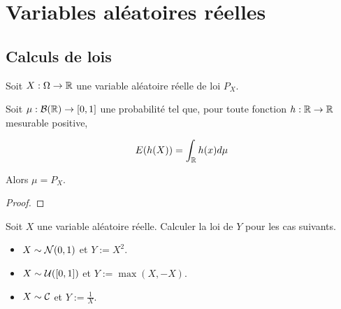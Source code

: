 \chapter{Variables aléatoires réelles}

\label{chapter:variables_aleatoires_reelles}

\section{Calculs de lois}

\begin{proposition}
	Soit $X : \Omega \rightarrow \mathbb{R}$ une variable aléatoire réelle de loi
	$P_{X}$.

	Soit $\mu : \mathcal{B}(\mathbb{R}) \rightarrow [0, 1]$ une probabilité
	tel que, pour toute fonction $h : \mathbb{R} \rightarrow \mathbb{R}$ mesurable
	positive,

	\begin{equation}
		E(h(X)) = \int_{\mathbb{R}} h(x) d\mu
	\end{equation}

	Alors $\mu = P_{X}$.
\end{proposition}

\ifdefined\outputproof
\begin{proof}

\end{proof}

\begin{exercice}
	Soit $X$ une variable aléatoire réelle. Calculer la loi de $Y$ pour les cas
	suivants.
	\begin{itemize}
		\item $X \sim \mathcal{N}(0, 1)$ et $Y := X^{2}$.
		\item $X \sim \mathcal{U}([0, 1])$ et $Y := \max(X, -X)$.
		\item $X \sim \mathcal{C}$ et $Y := \frac{1}{X}$.
	\end{itemize}
\end{exercice}
